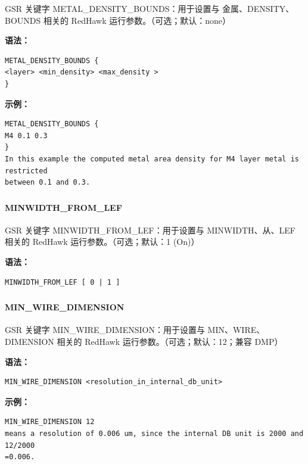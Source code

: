 GSR 关键字 METAL_DENSITY_BOUNDS：用于设置与 金属、DENSITY、BOUNDS 相关的 RedHawk 运行参数。（可选；默认：none）

\textbf{语法：}
\begin{lstlisting}
METAL_DENSITY_BOUNDS {
<layer> <min_density> <max_density >
}
\end{lstlisting}

\textbf{示例：}
\begin{lstlisting}
METAL_DENSITY_BOUNDS {
M4 0.1 0.3
}
In this example the computed metal area density for M4 layer metal is restricted
between 0.1 and 0.3.
\end{lstlisting}

\subsubsection{}
\paragraph*{MINWIDTH_FROM_LEF}

GSR 关键字 MINWIDTH_FROM_LEF：用于设置与 MINWIDTH、从、LEF 相关的 RedHawk 运行参数。（可选；默认：1 (On)）

\textbf{语法：}
\begin{lstlisting}
MINWIDTH_FROM_LEF [ 0 | 1 ]
\end{lstlisting}

\subsubsection{}
\paragraph*{MIN_WIRE_DIMENSION}

GSR 关键字 MIN_WIRE_DIMENSION：用于设置与 MIN、WIRE、DIMENSION 相关的 RedHawk 运行参数。（可选；默认：12；兼容 DMP）

\textbf{语法：}
\begin{lstlisting}
MIN_WIRE_DIMENSION <resolution_in_internal_db_unit>
\end{lstlisting}

\textbf{示例：}
\begin{lstlisting}
MIN_WIRE_DIMENSION 12
means a resolution of 0.006 um, since the internal DB unit is 2000 and 12/2000
=0.006.
\end{lstlisting}

\subsubsection{}
